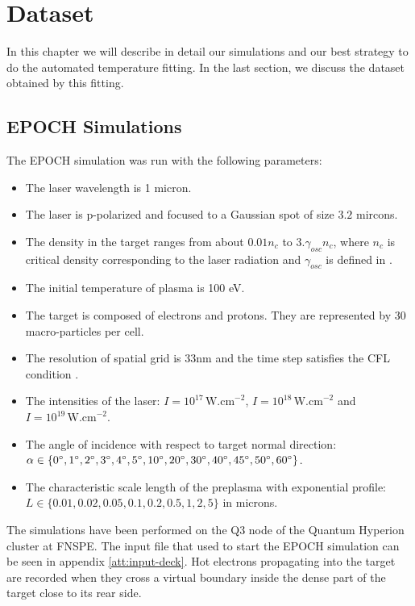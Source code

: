 \chapter{Dataset}
\label{ch:dataset}
In this chapter we will describe in detail our simulations and our best strategy to do the automated temperature fitting. In the last section, we discuss the dataset obtained by this fitting.
\section{EPOCH Simulations}
The EPOCH simulation was run with the following parameters:
\begin{itemize}
	\item The laser wavelength is 1 micron.
	\item The laser is p-polarized and focused to a Gaussian spot of size $3.2$ mircons.
	\item The density in the target ranges from about $0.01n_c$ to $3.\gamma_{osc}n_c$, where $n_c$ is critical density corresponding to the laser radiation \cite{cui2013} and $\gamma_{osc}$ is defined in \cite{cui2013}.
	\item The initial temperature of plasma is 100 eV.
	\item The target is composed of electrons and protons. They are represented by 30 macro-particles per cell.
	\item The resolution of spatial grid is 33nm and the time step satisfies the CFL condition \cite{arber2015}.
	\item The intensities of the laser: $I=10^{17}\,\mathrm{W.cm}^{-2}$, $I=10^{18} \,\mathrm{W.cm}^{-2}$ and \newline$I=10^{19}\,\mathrm{W.cm}^{-2}$.
	\item The angle of incidence with respect to target normal direction: \newline $\alpha \in \{0\degree,1\degree,2\degree,3\degree,4\degree,5\degree,10\degree,20\degree,30\degree,40\degree,45\degree,50\degree,60\degree\}$.
	\item The characteristic scale length of the preplasma with exponential profile: \newline $L\in\{0.01,0.02,0.05,0.1,0.2,0.5,1,2,5\}$ in microns.
	
\end{itemize}
The simulations have been performed on the Q3 node of the Quantum Hyperion cluster at FNSPE. The input file that used to start the EPOCH simulation can be seen in appendix \ref{att:input-deck}. Hot electrons propagating into the target are recorded when they cross a virtual boundary inside the dense part of the target close to its rear side.

